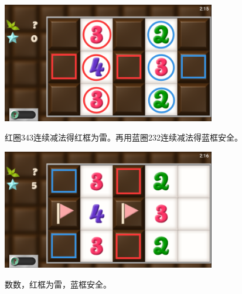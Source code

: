 \subsection{} %
\begin{center}
    \includegraphics[width=0.7\textwidth]{puzzle/28-1.png}
\end{center}
红圈343连续减法得红框为雷。再用蓝圈232连续减法得蓝框安全。
\begin{center}
    \includegraphics[width=0.7\textwidth]{puzzle/28-2.png}
\end{center}
数数，红框为雷，蓝框安全。

